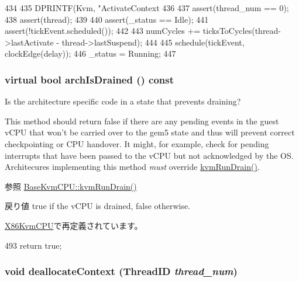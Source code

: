 \begin{DoxyCode}
434 {
435     DPRINTF(Kvm, "ActivateContext %
436 
437     assert(thread_num == 0);
438     assert(thread);
439 
440     assert(_status == Idle);
441     assert(!tickEvent.scheduled());
442 
443     numCycles += ticksToCycles(thread->lastActivate - thread->lastSuspend);
444 
445     schedule(tickEvent, clockEdge(delay));
446     _status = Running;
447 }
\end{DoxyCode}
\hypertarget{classBaseKvmCPU_a4ee4cbdc5d3315fd8016b44d3e77abd5}{
\subsubsection[{archIsDrained}]{\setlength{\rightskip}{0pt plus 5cm}virtual bool archIsDrained () const}}
\label{classBaseKvmCPU_a4ee4cbdc5d3315fd8016b44d3e77abd5}
Is the architecture specific code in a state that prevents draining?

This method should return false if there are any pending events in the guest vCPU that won't be carried over to the gem5 state and thus will prevent correct checkpointing or CPU handover. It might, for example, check for pending interrupts that have been passed to the vCPU but not acknowledged by the OS. Architecures implementing this method {\itshape must\/} override \hyperlink{classBaseKvmCPU_a405afc17ad0dee3b816012ce909b2b6f}{kvmRunDrain()}.

\begin{DoxySeeAlso}{参照}
\hyperlink{classBaseKvmCPU_a405afc17ad0dee3b816012ce909b2b6f}{BaseKvmCPU::kvmRunDrain()}
\end{DoxySeeAlso}
\begin{DoxyReturn}{戻り値}
true if the vCPU is drained, false otherwise. 
\end{DoxyReturn}


\hyperlink{classX86KvmCPU_a1d97c7e0665d576bb463335078bb02ec}{X86KvmCPU}で再定義されています。


\begin{DoxyCode}
493 { return true; }
\end{DoxyCode}
\hypertarget{classBaseKvmCPU_a49259982c98a7959f39b77db5069fea0}{
\subsubsection[{deallocateContext}]{\setlength{\rightskip}{0pt plus 5cm}void deallocateContext ({\bf ThreadID} {\em thread\_\-num})}}
\label{classBaseKvmCPU_a49259982c98a7959f39b77db5069fea0}




